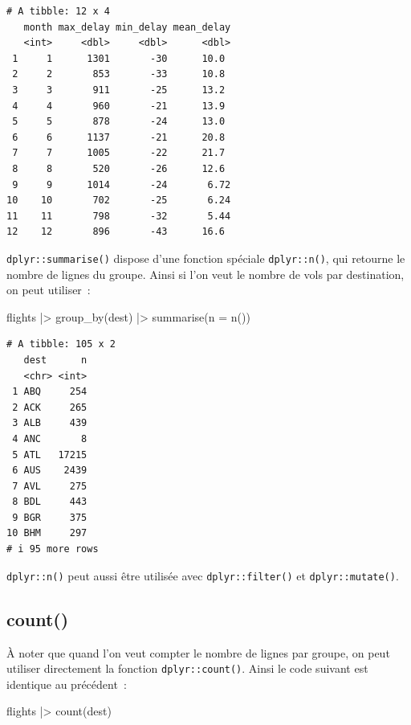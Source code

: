 \documentclass[
  letterpaper,
  DIV=11,
  numbers=noendperiod,
  oneside]{scrreprt}
\newenvironment{Shaded}{\begin{snugshade}}{\end{snugshade}}
\newcommand{\AttributeTok}[1]{\textcolor[rgb]{0.40,0.45,0.13}{#1}}
\newcommand{\FunctionTok}[1]{\textcolor[rgb]{0.28,0.35,0.67}{#1}}
\newcommand{\NormalTok}[1]{\textcolor[rgb]{0.00,0.23,0.31}{#1}}
\newcommand{\SpecialCharTok}[1]{\textcolor[rgb]{0.37,0.37,0.37}{#1}}
\begin{document}
\begin{verbatim}
# A tibble: 12 x 4
   month max_delay min_delay mean_delay
   <int>     <dbl>     <dbl>      <dbl>
 1     1      1301       -30      10.0 
 2     2       853       -33      10.8 
 3     3       911       -25      13.2 
 4     4       960       -21      13.9 
 5     5       878       -24      13.0 
 6     6      1137       -21      20.8 
 7     7      1005       -22      21.7 
 8     8       520       -26      12.6 
 9     9      1014       -24       6.72
10    10       702       -25       6.24
11    11       798       -32       5.44
12    12       896       -43      16.6 
\end{verbatim}

\texttt{dplyr::summarise()} dispose d'une fonction spéciale
\texttt{dplyr::n()}, qui retourne le nombre de lignes du groupe. Ainsi
si l'on veut le nombre de vols par destination, on peut utiliser~:

\begin{Shaded}
\begin{Highlighting}[]
\NormalTok{flights }\SpecialCharTok{|\textgreater{}}
  \FunctionTok{group\_by}\NormalTok{(dest) }\SpecialCharTok{|\textgreater{}}
  \FunctionTok{summarise}\NormalTok{(}\AttributeTok{n =} \FunctionTok{n}\NormalTok{())}
\end{Highlighting}
\end{Shaded}

\begin{verbatim}
# A tibble: 105 x 2
   dest      n
   <chr> <int>
 1 ABQ     254
 2 ACK     265
 3 ALB     439
 4 ANC       8
 5 ATL   17215
 6 AUS    2439
 7 AVL     275
 8 BDL     443
 9 BGR     375
10 BHM     297
# i 95 more rows
\end{verbatim}

\texttt{dplyr::n()} peut aussi être utilisée avec
\texttt{dplyr::filter()} et \texttt{dplyr::mutate()}.

\hypertarget{count}{%
\subsection{count()}\label{count}}

À noter que quand l'on veut compter le nombre de lignes par groupe, on
peut utiliser directement la fonction \texttt{dplyr::count()}. Ainsi le
code suivant est identique au précédent~:

\begin{Shaded}
\begin{Highlighting}[]
\NormalTok{flights }\SpecialCharTok{|\textgreater{}}
  \FunctionTok{count}\NormalTok{(dest)}
\end{Highlighting}
\end{Shaded}
\end{document}
